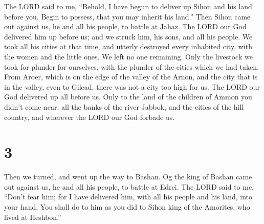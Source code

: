  The LORD said to me, ``Behold, I have begun to deliver up
Sihon and his land before you. Begin to possess, that you may inherit
his land.''  Then Sihon came out against us, he and all his
people, to battle at Jahaz.  The LORD our God delivered him
up before us; and we struck him, his sons, and all his people.
 We took all his cities at that time, and utterly destroyed
every inhabited city, with the women and the little ones. We left no one
remaining.  Only the livestock we took for plunder for
ourselves, with the plunder of the cities which we had taken.
 From Aroer, which is on the edge of the valley of the
Arnon, and the city that is in the valley, even to Gilead, there was not
a city too high for us. The LORD our God delivered up all before us.
 Only to the land of the children of Ammon you didn't come
near: all the banks of the river Jabbok, and the cities of the hill
country, and wherever the LORD our God forbade us.

\hypertarget{section-2}{%
\section{3}\label{section-2}}

 Then we turned, and went up the way to Bashan. Og the king
of Bashan came out against us, he and all his people, to battle at
Edrei.  The LORD said to me, ``Don't fear him; for I have
delivered him, with all his people and his land, into your hand. You
shall do to him as you did to Sihon king of the Amorites, who lived at
Heshbon.''

